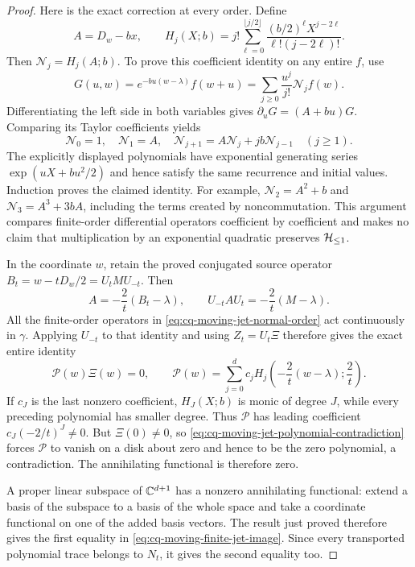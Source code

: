 \begin{proof}
Here is the exact correction at every order. Define
\begin{equation}
 A=D_w-bx,\qquad
 H_j(X;b)=j!\sum_{\ell=0}^{\lfloor j/2\rfloor}
        \frac{(b/2)^\ell X^{j-2\ell}}
             {\ell!(j-2\ell)!}.
 \label{eq:cq-moving-jet-Hermite-polynomial}
\end{equation}
Then $\mathcal N_j=H_j(A;b)$. To prove this coefficient
identity on any entire $f$, use
\[
 G(u,w)=e^{-bu(w-\lambda)}f(w+u)
       =\sum_{j\ge0}\frac{u^j}{j!}\mathcal N_jf(w).
\]
Differentiating the left side in both variables gives
$\partial_uG=(A+bu)G$. Comparing its Taylor coefficients yields
\[
 \mathcal N_0=1,\quad \mathcal N_1=A,\quad
 \mathcal N_{j+1}=A\mathcal N_j+jb\mathcal N_{j-1}
 \quad(j\ge1).
\]
The explicitly displayed polynomials have exponential generating
series $\exp(uX+bu^2/2)$ and hence satisfy the same recurrence
and initial values. Induction proves the claimed identity.
For example, $\mathcal N_2=A^2+b$ and
$\mathcal N_3=A^3+3bA$, including the terms created by
noncommutation. This argument compares finite-order differential
operators coefficient by coefficient and makes no claim that
multiplication by an exponential quadratic preserves $\mathcal H_{\leq 1}$.

In the coordinate $w$, retain the proved conjugated source
operator $B_t=w-tD_w/2=U_tMU_{-t}$. Then
\[
 A=-\frac2t(B_t-\lambda),\qquad
 U_{-t}AU_t=-\frac2t(M-\lambda).
\]
All the finite-order operators in
\eqref{eq:cq-moving-jet-normal-order} act continuously in
$\gamma$. Applying $U_{-t}$ to that identity and using
$Z_t=U_t\Xi$ therefore gives the exact entire identity
\begin{equation}
 \mathcal P(w)\Xi(w)=0,\qquad
 \mathcal P(w)=\sum_{j=0}^d
   c_jH_j\left(-\frac2t(w-\lambda);\frac2t\right).
 \label{eq:cq-moving-jet-polynomial-contradiction}
\end{equation}
If $c_J$ is the last nonzero coefficient, $H_J(X;b)$ is
monic of degree $J$, while every preceding polynomial has
smaller degree. Thus $\mathcal P$ has leading coefficient
$c_J(-2/t)^J\ne0$. But $\Xi(0)\ne0$, so
\eqref{eq:cq-moving-jet-polynomial-contradiction} forces
$\mathcal P$ to vanish on a disk about zero and hence to
be the zero polynomial, a contradiction. The annihilating
functional is therefore zero.

A proper linear subspace of $\mathbb C^{d+1}$ has a nonzero
annihilating functional: extend a basis of the subspace to a
basis of the whole space and take a coordinate functional
on one of the added basis vectors. The result just proved
therefore gives the first equality in
\eqref{eq:cq-moving-finite-jet-image}. Since every transported
polynomial trace belongs to $N_t$, it gives the second
equality too.


\end{proof}
